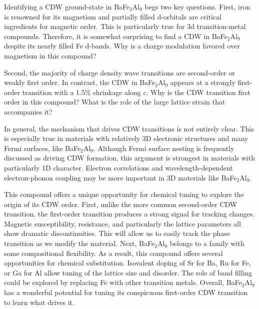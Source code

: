 \documentclass[journal=cmatex,manuscript=article]{achemso}
\begin{document}
\label{sec:Discussion_OpenQs}
Identifying a CDW ground-state in BaFe$_2$Al$_9$ begs two key questions. First, iron is renowned for its magnetism and partially filled d-orbitals are critical ingredients for magnetic order.\cite{Blundell2001_MagnetismInCondensedMatter} This is particularly true for 3d transition-metal compounds. Therefore, it is somewhat surprising to find a CDW in BaFe$_2$Al$_9$ despite its nearly filled Fe d-bands. Why is a charge modulation favored over magnetism in this compound?

Second, the majority of charge density wave transitions are second-order or weakly first order.\cite{Gruner1994_DensityWavesInSolids} In contrast, the CDW in BaFe$_2$Al$_9$ appears at a strongly first-order transition with a 1.5\% shrinkage along $c$. Why is the CDW transition first order in this compound? What is the role of the large lattice strain that accompanies it?

In general, the mechanism that drives CDW transitions is not entirely clear.\cite{Gruner1994_DensityWavesInSolids,Zhu2017_MisconceptionsChargeDensityWaves} This is especially true in materials with relatively 3D electronic structures and many Fermi surfaces, like BaFe$_2$Al$_9$. Although Fermi surface nesting is frequently discussed as driving CDW formation, this argument is strongest in materials with particularly 1D character. Electron correlations and wavelength-dependent electron-phonon coupling may be more important in 3D materials like BaFe$_2$Al$_9$.

This compound offers a unique opportunity for chemical tuning to explore the origin of its CDW order. First, unlike the more common second-order CDW transition, the first-order transition produces a strong signal for tracking changes. Magnetic susceptibility, resistance, and particularly the lattice parameters all show dramatic discontinuities. This will allow us to easily track the phase transition as we modify the material. Next, BaFe$_2$Al$_9$ belongs to a family with some compositional flexibility.\cite{Vajenine1998_MagicElectronCountsAeM2Al9} As a result, this compound offers several opportunities for chemical substitution. Isovalent doping of Sr for Ba, Ru for Fe, or Ga for Al allow tuning of the lattice size and disorder. The role of band filling could be explored by replacing Fe with other transition metals. Overall, BaFe$_2$Al$_9$ has a wonderful potential for tuning its conspicuous first-order CDW transition to learn what drives it. 

\label{sec:Discussion_Summary}
\end{document}
